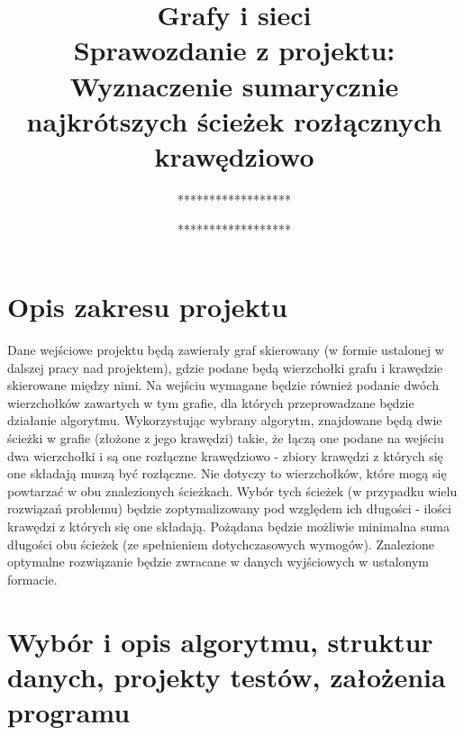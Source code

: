 \documentclass[a4paper,12pt]{article}
\author{
  ******************\\
  \and
  ******************\\
}
\title{
Grafy i sieci\\
Sprawozdanie z projektu:\\
\textbf{Wyznaczenie sumarycznie najkrótszych ścieżek rozłącznych krawędziowo}
}
\newcommand\tab[1][1cm]{\hspace*{#1}}
\begin{document}
\maketitle

\section{Opis zakresu projektu}
\tab
Dane wejściowe projektu będą zawierały graf skierowany (w formie ustalonej w dalszej pracy nad projektem), gdzie podane będą wierzchołki grafu i krawędzie skierowane między nimi. Na wejściu wymagane będzie również podanie dwóch wierzchołków zawartych w tym grafie, dla których przeprowadzane będzie działanie algorytmu. Wykorzystując wybrany algorytm, znajdowane będą dwie ścieżki w grafie (złożone z jego krawędzi) takie, że łączą one podane na wejściu dwa wierzchołki i są one rozłączne krawędziowo - zbiory krawędzi z których się one składają muszą być rozłączne. Nie dotyczy to wierzchołków, które mogą się powtarzać w obu znalezionych ścieżkach. Wybór tych ścieżek (w przypadku wielu rozwiązań problemu) będzie zoptymalizowany pod względem ich długości - ilości krawędzi z których się one składają. Pożądana będzie możliwie minimalna suma długości obu ścieżek (ze spełnieniem dotychczasowych wymogów). Znalezione optymalne rozwiązanie będzie zwracane w danych wyjściowych w ustalonym formacie.\par

\section{Wybór i opis algorytmu, struktur danych, projekty testów, założenia programu}
\end{document}
